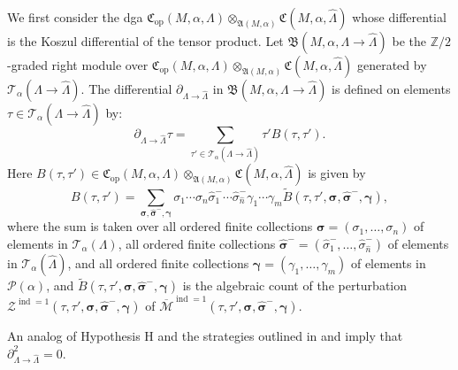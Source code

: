 \documentclass[10pt]{amsart}
\let\mathcal\mathscr
\let\ra\rightarrow
\newcommand{\opp}{\mathrm{op}}
\theoremstyle{plain}
\theoremstyle{definition}
\numberwithin{equation}{subsection}
\let\op\operatorname
\let\bs\boldsymbol
\begin{document}
We first consider the dga $\mathfrak{C}_{\opp}(M,\alpha,\Lambda) \otimes_{\mathfrak{A}(M,\alpha)} \mathfrak{C}(M,\alpha,\widehat{\Lambda})$ whose differential is the Koszul differential of the tensor product. Let $\mathfrak{B}(M,\alpha,\Lambda\ra\widehat{\Lambda})$ be the $\mathbb{Z}/2$-graded right module over $\mathfrak{C}_{\opp}(M,\alpha,\Lambda) \otimes_{\mathfrak{A}(M,\alpha)} \mathfrak{C}(M,\alpha,\widehat{\Lambda})$ generated by $\mathcal{T}_\alpha(\Lambda\ra\widehat{\Lambda})$.
The differential $\partial_{\Lambda\ra\widehat{\Lambda}}$ in $\mathfrak{B}(M,\alpha,\Lambda\ra\widehat{\Lambda})$ is defined on elements
$\tau \in \mathcal{T}_\alpha(\Lambda\ra\widehat{\Lambda})$ by:
\begin{equation}%
\partial_{\Lambda\ra\widehat{\Lambda}} \tau = \sum_{\tau' \in \mathcal{T}_\alpha(\Lambda\ra\widehat{\Lambda})} \tau' B(\tau,\tau').
\end{equation}
Here $B(\tau,\tau')\in \mathfrak{C}_{\opp}(M,\alpha,\Lambda) \otimes_{\mathfrak{A}(M,\alpha)} \mathfrak{C}(M,\alpha,\widehat{\Lambda})$ is given by
\begin{equation}%
B(\tau,\tau') = \sum
_{\bs\sigma,\widehat{\bs\sigma}^-,\bs\gamma} \sigma_1 \cdots\sigma_n\widehat{\sigma}^-_1\cdots\widehat{\sigma}^-_{\widehat{n}}
\gamma_1\cdots\gamma_m \widetilde{B}(\tau,\tau',\bs\sigma,\widehat{\bs\sigma}^-,\bs\gamma),
\end{equation}
where the sum is taken over all ordered finite collections $\bs\sigma=(\sigma_1,\dots,\sigma_n)$ of \hbox{elements} in $\mathcal{T}_\alpha(\Lambda)$, all ordered finite collections $\widehat{\bs\sigma}^-=(\widehat{\sigma}^-_1,\dots,\widehat{\sigma}^-_{\widehat{n}})$ of elements in $\mathcal{T}_\alpha(\widehat{\Lambda})$, and all ordered finite collections $\bs\gamma=(\gamma_1,\dots,\gamma_m)$ of elements in $\mathcal{P}(\alpha)$, and $\widetilde{B}(\tau,\tau',\bs\sigma,\widehat{\bs\sigma}^-,\bs\gamma)$ is the algebraic count of the perturbation $\mathcal{Z}^{\op{ind}=1}(\tau,\tau',\bs\sigma, \widehat{\bs\sigma}^-,\bs\gamma)$ of $\overline{\mathcal{M}}^{\op{ind}=1}(\tau,\tau',\bs\sigma, \widehat{\bs\sigma}^-, \bs\gamma)$.

An analog of Hypothesis H and the strategies outlined in \cite[\S 7]{BEE} and \cite[\S 2.8]{SFT} imply that $\partial_{\Lambda\ra\widehat{\Lambda}}^2 = 0$.
\end{document}
